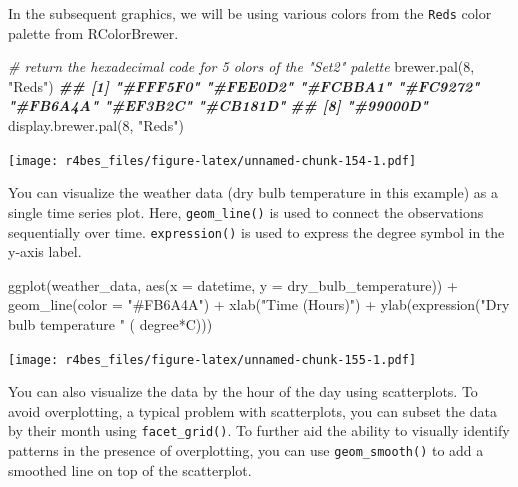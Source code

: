 \documentclass[
]{book}
\newenvironment{Shaded}{\begin{snugshade}}{\end{snugshade}}
\newcommand{\AttributeTok}[1]{\textcolor[rgb]{0.77,0.63,0.00}{#1}}
\newcommand{\CommentTok}[1]{\textcolor[rgb]{0.56,0.35,0.01}{\textit{#1}}}
\newcommand{\DecValTok}[1]{\textcolor[rgb]{0.00,0.00,0.81}{#1}}
\newcommand{\DocumentationTok}[1]{\textcolor[rgb]{0.56,0.35,0.01}{\textbf{\textit{#1}}}}
\newcommand{\FunctionTok}[1]{\textcolor[rgb]{0.00,0.00,0.00}{#1}}
\newcommand{\NormalTok}[1]{#1}
\newcommand{\SpecialCharTok}[1]{\textcolor[rgb]{0.00,0.00,0.00}{#1}}
\newcommand{\StringTok}[1]{\textcolor[rgb]{0.31,0.60,0.02}{#1}}
\begin{document}
In the subsequent graphics, we will be using various colors from the \texttt{Reds} color palette from RColorBrewer.

\begin{Shaded}
\begin{Highlighting}[]
\CommentTok{\# return the hexadecimal code for 5 olors of the "Set2" palette}
\FunctionTok{brewer.pal}\NormalTok{(}\DecValTok{8}\NormalTok{, }\StringTok{"Reds"}\NormalTok{)}
\DocumentationTok{\#\# [1] "\#FFF5F0" "\#FEE0D2" "\#FCBBA1" "\#FC9272" "\#FB6A4A" "\#EF3B2C" "\#CB181D"}
\DocumentationTok{\#\# [8] "\#99000D"}
\FunctionTok{display.brewer.pal}\NormalTok{(}\DecValTok{8}\NormalTok{, }\StringTok{"Reds"}\NormalTok{)}
\end{Highlighting}
\end{Shaded}

\texttt{[image: r4bes\_files/figure-latex/unnamed-chunk-154-1.pdf]}

You can visualize the weather data (dry bulb temperature in this example) as a single time series plot. Here, \texttt{geom\_line()} is used to connect the observations sequentially over time. \texttt{expression()} is used to express the degree symbol in the y-axis label.

\begin{Shaded}
\begin{Highlighting}[]
\FunctionTok{ggplot}\NormalTok{(weather\_data, }\FunctionTok{aes}\NormalTok{(}\AttributeTok{x =}\NormalTok{ datetime, }\AttributeTok{y =}\NormalTok{ dry\_bulb\_temperature)) }\SpecialCharTok{+}
    \FunctionTok{geom\_line}\NormalTok{(}\AttributeTok{color =} \StringTok{"\#FB6A4A"}\NormalTok{) }\SpecialCharTok{+}
    \FunctionTok{xlab}\NormalTok{(}\StringTok{"Time (Hours)"}\NormalTok{) }\SpecialCharTok{+}
    \FunctionTok{ylab}\NormalTok{(}\FunctionTok{expression}\NormalTok{(}\StringTok{"Dry bulb temperature "}\NormalTok{ ( degree}\SpecialCharTok{*}\NormalTok{C)))}
\end{Highlighting}
\end{Shaded}

\texttt{[image: r4bes\_files/figure-latex/unnamed-chunk-155-1.pdf]}

You can also visualize the data by the hour of the day using scatterplots. To avoid overplotting, a typical problem with scatterplots, you can subset the data by their month using \texttt{facet\_grid()}. To further aid the ability to visually identify patterns in the presence of overplotting, you can use \texttt{geom\_smooth()} to add a smoothed line on top of the scatterplot.
\end{document}
